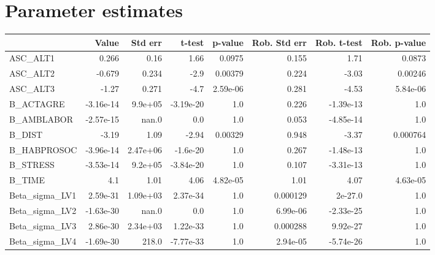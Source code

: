 \section{Parameter estimates}
\begin{tabular}{lrrrrrrr}
\toprule
{} &     Value &  Std err &    t-test &  p-value &  Rob. Std err &  Rob. t-test &  Rob. p-value \\
\midrule
ASC\_ALT1       &     0.266 &     0.16 &      1.66 &   0.0975 &         0.155 &         1.71 &        0.0873 \\
ASC\_ALT2       &    -0.679 &    0.234 &      -2.9 &  0.00379 &         0.224 &        -3.03 &       0.00246 \\
ASC\_ALT3       &     -1.27 &    0.271 &      -4.7 & 2.59e-06 &         0.281 &        -4.53 &      5.84e-06 \\
B\_ACTAGRE      & -3.16e-14 &  9.9e+05 & -3.19e-20 &      1.0 &         0.226 &    -1.39e-13 &           1.0 \\
B\_AMBLABOR     & -2.57e-15 &    nan.0 &       0.0 &      1.0 &         0.053 &    -4.85e-14 &           1.0 \\
B\_DIST         &     -3.19 &     1.09 &     -2.94 &  0.00329 &         0.948 &        -3.37 &      0.000764 \\
B\_HABPROSOC    & -3.96e-14 & 2.47e+06 &  -1.6e-20 &      1.0 &         0.267 &    -1.48e-13 &           1.0 \\
B\_STRESS       & -3.53e-14 &  9.2e+05 & -3.84e-20 &      1.0 &         0.107 &    -3.31e-13 &           1.0 \\
B\_TIME         &       4.1 &     1.01 &      4.06 & 4.82e-05 &          1.01 &         4.07 &      4.63e-05 \\
Beta\_sigma\_LV1 &  2.59e-31 & 1.09e+03 &  2.37e-34 &      1.0 &      0.000129 &      2e-27.0 &           1.0 \\
Beta\_sigma\_LV2 & -1.63e-30 &    nan.0 &       0.0 &      1.0 &      6.99e-06 &    -2.33e-25 &           1.0 \\
Beta\_sigma\_LV3 &  2.86e-30 & 2.34e+03 &  1.22e-33 &      1.0 &      0.000288 &     9.92e-27 &           1.0 \\
Beta\_sigma\_LV4 & -1.69e-30 &    218.0 & -7.77e-33 &      1.0 &      2.94e-05 &    -5.74e-26 &           1.0 \\
\bottomrule
\end{tabular}

